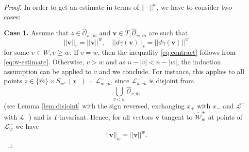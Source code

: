 \documentclass[10pt,a4paper]{amsart}
\def\bv{\mathbf{v}}
\def\cL{{\mathscr{L}}}
\def\cO{{\mathscr{O}}}
\def\cW{{\mathscr{W}}}
\def\ga{\gamma}
\begin{document}
\begin{proof}
In order to get an estimate in terms of $||\cdot||^w$, we have to consider two cases:  

{\bf Case 1.} Assume that $z\in \hat{\cO}_{w,\hat{m}}$ and $\bv\in T_z \hat{\cO}_{w,\hat{m}}$ are such that  
$$
||\bv||_v= ||\bv||^w, \quad ||d\ga(\bv)||_v= ||d\ga(\bv)||^w 
$$
for some $v\in W, v \geqslant w$. If $v = w$, then the inequality \eqref{eq:contract} follows from \eqref{eq:w-estimate}. Otherwise, $v> w$ and as $n- |v| < n-|w|$, the induction assumption can be applied to $v$ and we conclude.
For instance, this applies 
to all points $z\in \{ \hat{m} \} \times S_{w^\vee}(x_-)=\cL_{w,\hat{m}}^-$, since $\cL_{w, \hat{m}}^-$ is disjoint from 
$$
\bigcup_{v <  w} \hat{\cO}_{v, \hat{m}}
$$
(see Lemma \ref{lem:disjoint} with the sign reversed, exchanging $x_+$ with $x_-$ and $\mathcal{L}^+$ with $\cL^-$) and is $T$-invariant. Hence,  for all vectors $\bv$ tangent to $\hat{\cW}_w^+$ at points of $\cL_w^-$ we have
$$
||\bv||_w=||\bv||^w. 
$$


\end{proof}
\end{document}
